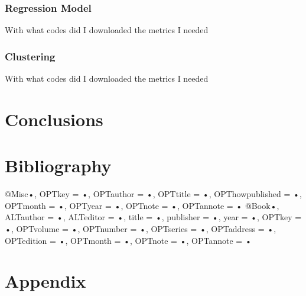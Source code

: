 \documentclass{article}
\begin{document}
\subsubsection{Regression Model}
With what codes did I downloaded the metrics I needed
\subsubsection{Clustering}
With what codes did I downloaded the metrics I needed
\pagebreak  
\section{Conclusions}
\pagebreak  
\section{Bibliography}
\begin{thebibliography}{widest-label}
@Misc{•,
OPTkey = {•},
OPTauthor = {•},
OPTtitle = {•},
OPThowpublished = {•},
OPTmonth = {•},
OPTyear = {•},
OPTnote = {•},
OPTannote = {•}
}
@Book{•,
ALTauthor = {•},
ALTeditor = {•},
title = {•},
publisher = {•},
year = {•},
OPTkey = {•},
OPTvolume = {•},
OPTnumber = {•},
OPTseries = {•},
OPTaddress = {•},
OPTedition = {•},
OPTmonth = {•},
OPTnote = {•},
OPTannote = {•}
}

\end{thebibliography}
\pagebreak  
\section{Appendix}
\end{document}
